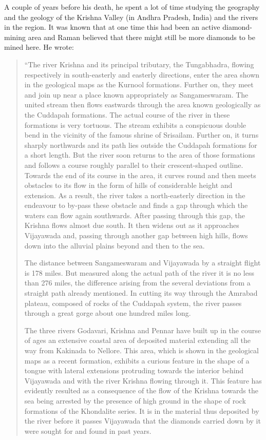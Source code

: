 A couple of years before his death, he spent a lot of time studying the geography and the geology of the Krishna Valley (in Andhra Pradesh, India) and the rivers in the region. It was known that at one time this had been an active diamond-mining area and Raman believed that there might still be more diamonds to be mined here. He wrote:
\begin{quote}
{\fontsize{10pt}{12pt}\selectfont
``The river Krishna and its principal tributary, the Tungabhadra, flowing respectively in south-easterly and easterly directions, enter the area shown in the geological maps as the Kurnool formations. Further on, they meet and join up near a place known appropriately as Sangameswaram. The united stream then flows eastwards through the area known geologically as the Cuddapah formations. The actual course of the river in these formations is very tortuous. The stream exhibits a conspicuous double bend in the vicinity of the famous shrine of Srisailam. Further on, it turns sharply northwards and its path lies outside the Cuddapah formations for a short length. But the river soon returns to the area of those formations and follows a course roughly parallel to their crescent-shaped outline. Towards the end of its course in the area, it curves round and then meets obstacles to its flow in the form of hills of considerable height and extension. As a result, the river takes a north-easterly direction in the endeavour to by-pass these obstacle and finds a gap through which the waters can flow again southwards. After passing through this gap, the Krishna flows almost due south. It then widens out as it approaches Vijayawada and, passing through another gap between high hills, flows down into the alluvial plains beyond and then to the sea.

The distance between Sangameswaram and Vijayawada by a strai\-ght flight is 178 miles. But measured along the actual path of the river it is no less than 276 miles, the difference arising from the several deviations from a straight path already mentioned. In cutting its way through the Amrabad plateau, composed of rocks of the Cuddapah system, the river passes through a great gorge about one hundred miles long.

The three rivers Godavari, Krishna and Pennar have built up in the course of ages an extensive coastal area of deposited material extending all the way from Kakinada to Nellore. This area, which is shown in the geological maps as a recent formation, exhibits a curious feature in the shape of a tongue with lateral extensions protruding towards the interior behind Vijayawada and with the river Krishna flowing through it. This feature has evidently resulted as a consequence of the flow of the Krishna towards the sea being arrested by the presence of high ground in the shape of rock formations of the Khondalite series. It is in the material thus deposited by the river before it passes Vijayawada that the diamonds carried down by it were sought for and found in past years.

}
\end{quote}
